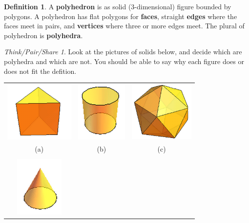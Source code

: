 \documentclass[12pt, reqno]{amsart}
\theoremstyle{remark}
\newtheorem*{thinkpair*}{Think/Pair/Share}
\theoremstyle{definition}
\newtheorem{define}[thm]{Definition}
\numberwithin{equation}{section}  %
\begin{document}
\bigskip

\begin{define}
A {\bf polyhedron} is as solid (3-dimensional) figure bounded by polygons.    A polyhedron has flat polygons for {\bf faces}, straight {\bf edges} where the faces meet in pairs, and {\bf vertices} where three or more edges meet.  The plural of polyhedron is {\bf polyhedra}.
\end{define}

\bigskip

\begin{thinkpair*}
Look at the pictures of solids below, and decide which are polyhedra and which are not.  You should be able to say why each figure does or does not fit the defition.
\end{thinkpair*}

\begin{center}
\begin{tabular}{ccc}
\quad
\includegraphics[height=3cm]{triprism}
\quad
&
\quad
\includegraphics[height=3cm]{cylinder}
\quad
&
\quad
\includegraphics[height=3cm]{icosahedron}
\quad\\
(a) & (b) & (c)\\
\\
\quad
\includegraphics[height=3cm]{cone}

\end{tabular}
\end{center}
\end{document}
